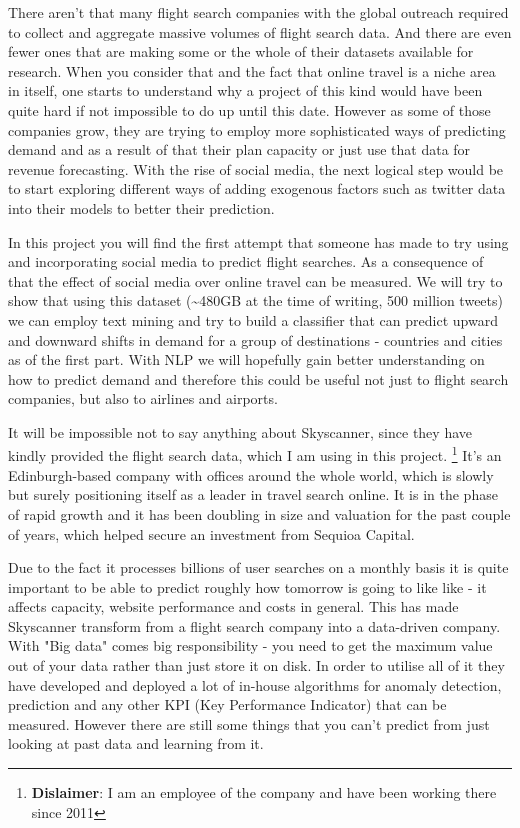 \documentclass[minf,frontabs,twoside,singlespacing,parskip]{infthesis}
\begin{document}
There aren't that many flight search companies with the global outreach required to collect and aggregate massive volumes of flight search data. And there are even fewer ones that are making some or the whole of their datasets available for research. When you consider that and the fact that online travel is a niche area in itself, one starts to understand why a project of this kind would have been quite hard if not impossible to do up until this date. However as some of those companies grow, they are trying to employ more sophisticated ways of predicting demand and as a result of that their plan capacity or just use that data for revenue forecasting. With the rise of social media, the next logical step would be to start exploring different ways of adding exogenous factors such as twitter data into their models to better their prediction. 


In this project you will find the first attempt that someone has made to try using and incorporating social media to predict flight searches. As a consequence of that the effect of social media over online travel can be measured. We will try to show that using this dataset (\textasciitilde 480GB at the time of writing, 500 million tweets) we can employ text mining and try to build a classifier that can predict upward and downward shifts in demand for a group of destinations - countries and cities as of the first part. With NLP we will hopefully gain better understanding on how to predict demand and therefore this could be useful not just to flight search companies, but also to airlines and airports. 


It will be impossible not to say anything about Skyscanner, since they have kindly provided the flight search data, which I am using in this project. \footnote{\textbf{Dislaimer}: I am an employee of the company and have been working there since 2011} It's an Edinburgh-based company with offices around the whole world, which is slowly but surely positioning itself as a leader in travel search online. It is in the phase of rapid growth and it has been doubling in size and valuation for the past couple of years, which helped secure an investment from Sequioa Capital. \cite{seqcap}


Due to the fact it processes billions of user searches on a monthly basis it is quite important to be able to predict roughly how tomorrow is going to like like - it affects capacity, website performance and costs in general. This has made Skyscanner transform from a flight search company into a data-driven company. With "Big data" comes big responsibility - you need to get the maximum value out of your data rather than just store it on disk. In order to utilise all of it they have developed and deployed a lot of in-house algorithms for anomaly detection, prediction and any other KPI (Key Performance Indicator) that can be measured. However there are still some things that you can't predict from just looking at past data and learning from it.
\end{document}
